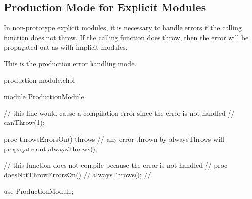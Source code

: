 \subsection{Production Mode for Explicit Modules}
\label{Production_Mode_for_Explicit_Modules}

In non-prototype explicit modules, it is necessary to handle errors if the
calling function does not throw. If the calling function does
throw, then the error will be propagated out as with implicit modules.

This is the production error handling mode.

\begin{chapelexample}{production-module.chpl}
\begin{chapel}
module ProductionModule {
  // this line would cause a compilation error since the error is not handled
  // canThrow(1);

  proc throwsErrorsOn() throws {
    // any error thrown by alwaysThrows will propagate out
    alwaysThrows();
  }

  // this function does not compile because the error is not handled
  // proc doesNotThrowErrorsOn() {
  //   alwaysThrows();
  // }
}

use ProductionModule;
\end{chapel}
\begin{chapelpost}
\end{chapelpost}
\begin{chapeloutput}
\end{chapeloutput}
\end{chapelexample}
